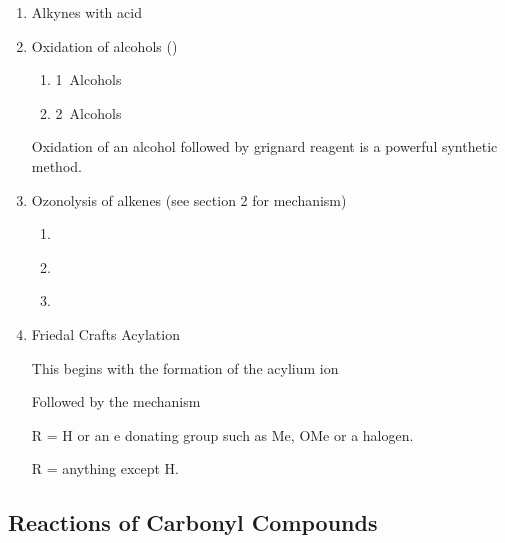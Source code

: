 \begin{enumerate}[label=\alph*)]

	\item Alkynes with acid

	\item Oxidation of alcohols ()

		\begin{enumerate}[label=\roman*)]

			\item 1\de\ Alcohols

			\item 2\de\ Alcohols

		\end{enumerate}

		Oxidation of an alcohol followed by grignard reagent is a powerful synthetic
		method.

	\item Ozonolysis of alkenes (see section 2 for mechanism)

		\begin{enumerate}[label=\roman*)]

			\item\

			\item\

			\item\

		\end{enumerate}

	\item Friedal Crafts Acylation


		This begins with the formation of the acylium ion


		Followed by the mechanism


		R = H or an e\super{-} donating group such as Me, OMe or a halogen.

		R = anything except H.

\end{enumerate}

\subsection{Reactions of Carbonyl Compounds}

